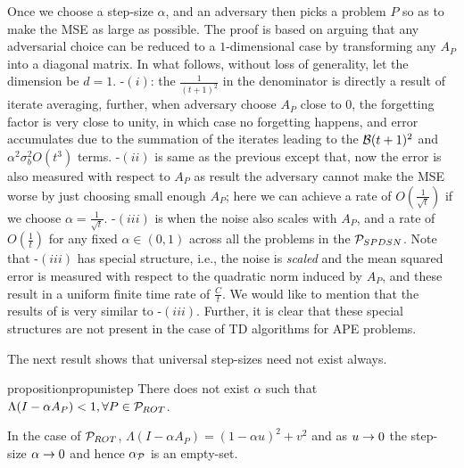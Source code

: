 Once we choose a step-size $\alpha$, and an adversary then picks a problem $P$ so as to make the MSE as large as possible. The proof is based on arguing that any adversarial choice can be reduced to a $1$-dimensional case by transforming any $A_P$ into a diagonal matrix. In what follows, without loss of generality, let the dimension be $d=1$.
-$(i)$: the $\frac{1}{(t+1)^2}$ in the denominator is directly a result of iterate averaging,  further, when adversary choose $A_P$ close to $0$, the forgetting factor is very close to unity, in which case no forgetting happens, and error accumulates due to the summation of the iterates leading to the $\B(t+1)^2$ and $\alpha^2 \sigma_b^2 O(t^3)$ terms. -$(ii)$ is same as the previous except that, now the error is also measured with respect to $A_P$ as result the adversary cannot make the MSE worse by just choosing small enough $A_P$; here we can achieve a rate of $O(\frac{1}{\sqrt{t}})$ if we choose $\alpha=\frac{1}{\sqrt{t}}$. -$(iii)$ is when the noise also scales with $A_P$, and a rate of $O(\frac{1}{t})$ for any fixed $\alpha\in(0,1)$ across all the problems in the $\P_{SPDSN}$. Note that -$(iii)$ has special structure, i.e., the noise is \emph{scaled} and the mean squared error is measured with respect to the quadratic norm induced by $A_P$, and these result in a uniform finite time rate of $\frac{C}{t}$. We would like to mention that the results of \citet{bach} is very similar to  -$(iii)$. Further, it is clear that these special structures are not present in the case of TD algorithms for APE problems.

The next result shows that universal step-sizes need not exist always.
\begin{restatable}{proposition}{propunistep}\label{prop:unistep}
There does not exist $\alpha$ such that $\Lambda(I-\alpha A_P)<1, \forall P\in \P_{ROT}$. 
\end{restatable}
In the case of $\P_{ROT}$,  $\Lambda(I-\alpha A_P)=(1-\alpha u)^2+v^2$ and as $u\ra 0$ the step-size $\alpha\ra 0$ and hence $\alpha_{\P}$ is an empty-set.

